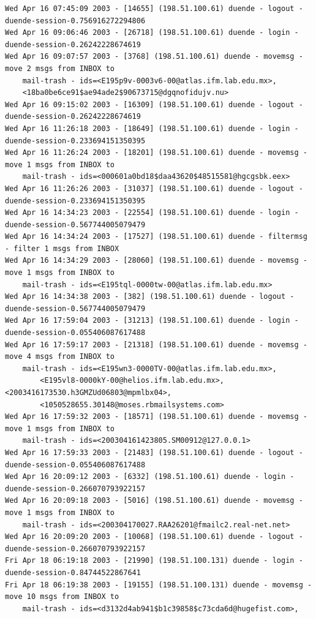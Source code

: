 \begin{lstlisting}[style=terminal]
Wed Apr 16 07:45:09 2003 - [14655] (198.51.100.61) duende - logout - duende-session-0.756916272294806
Wed Apr 16 09:06:46 2003 - [26718] (198.51.100.61) duende - login - duende-session-0.26242228674619
Wed Apr 16 09:07:57 2003 - [3768] (198.51.100.61) duende - movemsg - move 2 msgs from INBOX to 
    mail-trash - ids=<E195p9v-0003v6-00@atlas.ifm.lab.edu.mx>, 
    <18ba0be6ce91$ae94ade2$90673715@dgqnofidujv.nu>
Wed Apr 16 09:15:02 2003 - [16309] (198.51.100.61) duende - logout - duende-session-0.26242228674619
Wed Apr 16 11:26:18 2003 - [18649] (198.51.100.61) duende - login - duende-session-0.233694151350395
Wed Apr 16 11:26:24 2003 - [18201] (198.51.100.61) duende - movemsg - move 1 msgs from INBOX to 
    mail-trash - ids=<000601a0bd18$daa43620$48515581@hgcgsbk.eex>
Wed Apr 16 11:26:26 2003 - [31037] (198.51.100.61) duende - logout - duende-session-0.233694151350395
Wed Apr 16 14:34:23 2003 - [22554] (198.51.100.61) duende - login - duende-session-0.567744005079479
Wed Apr 16 14:34:24 2003 - [17527] (198.51.100.61) duende - filtermsg - filter 1 msgs from INBOX
Wed Apr 16 14:34:29 2003 - [28060] (198.51.100.61) duende - movemsg - move 1 msgs from INBOX to 
    mail-trash - ids=<E195tql-0000tw-00@atlas.ifm.lab.edu.mx>
Wed Apr 16 14:34:38 2003 - [382] (198.51.100.61) duende - logout - duende-session-0.567744005079479
Wed Apr 16 17:59:04 2003 - [31213] (198.51.100.61) duende - login - duende-session-0.055406087617488
Wed Apr 16 17:59:17 2003 - [21318] (198.51.100.61) duende - movemsg - move 4 msgs from INBOX to 
    mail-trash - ids=<E195wn3-0000TV-00@atlas.ifm.lab.edu.mx>, 
        <E195vl8-0000kY-00@helios.ifm.lab.edu.mx>, <2003416173530.h3GMZUd06803@mpmlbx04>, 
        <1050528655.30148@moses.rbmailsystems.com>
Wed Apr 16 17:59:32 2003 - [18571] (198.51.100.61) duende - movemsg - move 1 msgs from INBOX to 
    mail-trash - ids=<200304161423805.SM00912@127.0.0.1>
Wed Apr 16 17:59:33 2003 - [21483] (198.51.100.61) duende - logout - duende-session-0.055406087617488
Wed Apr 16 20:09:12 2003 - [6332] (198.51.100.61) duende - login - duende-session-0.266070793922157
Wed Apr 16 20:09:18 2003 - [5016] (198.51.100.61) duende - movemsg - move 1 msgs from INBOX to 
    mail-trash - ids=<200304170027.RAA26201@fmailc2.real-net.net>
Wed Apr 16 20:09:20 2003 - [10068] (198.51.100.61) duende - logout - duende-session-0.266070793922157
Fri Apr 18 06:19:18 2003 - [21990] (198.51.100.131) duende - login - duende-session-0.84744522867641
Fri Apr 18 06:19:38 2003 - [19155] (198.51.100.131) duende - movemsg - move 10 msgs from INBOX to 
    mail-trash - ids=<d3132d4ab941$b1c39858$c73cda6d@hugefist.com>, 

\end{lstlisting}
